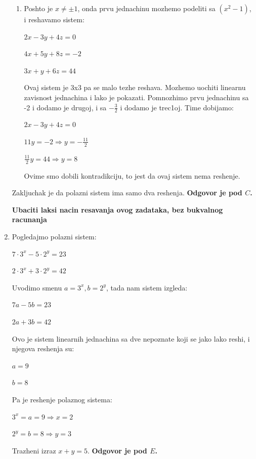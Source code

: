 \documentclass[a4paper,12pt]{article}
\begin{document}
\begin{enumerate}[1.]
\begin{enumerate}[1)]
\item Poshto je $x \neq \pm 1$, onda prvu jednachinu mozhemo podeliti sa $(x^2 - 1)$, i reshavamo sistem:
\begin{center}
\par $2x -3y + 4z = 0$
\par $4x + 5y +8z = -2$
\par $3x + y + 6z = 44$
\end{center}
\par Ovaj sistem je 3x3 pa se malo tezhe reshava. Mozhemo uochiti linearnu zavisnost jednachina i lako je pokazati. Pomnozhimo prvu jednachinu sa -2 i dodamo je drugoj, i sa $-\frac{3}{2}$ i dodamo je trec1oj. Time dobijamo:
\begin{center}
\par $2x -3y + 4z = 0$
\par $11y = -2 \Longrightarrow y = -\frac{11}{2}$
\par $\frac{11}{2}y = 44 \Longrightarrow y = 8$
\end{center}
\par Ovime smo dobili kontradikciju, to jest da ovaj sistem nema reshenje.
\end{enumerate}
\par Zakljuchak je da polazni sistem ima samo dva reshenja. \textbf{Odgovor je pod $C$.} 

\textbf{Ubaciti laksi nacin resavanja ovog zadataka, bez bukvalnog racunanja}

\item Pogledajmo polazni sistem:
\begin{center}
\par $7 \cdot 3^{x} - 5 \cdot 2^{y} = 23$
\par $2 \cdot 3^{x} + 3 \cdot 2^{y} = 42$
\end{center}
\par Uvodimo smenu $a = 3^x, b = 2^y$, tada nam sistem izgleda:
\begin{center}
\par $7 a - 5b = 23$
\par $2 a + 3 b = 42$
\end{center}
\par Ovo je sistem linearnih jednachina sa dve nepoznate koji se jako lako reshi, i njegova reshenja su:
\begin{center}
\par $a = 9$
\par $b = 8$
\end{center}
\par Pa je reshenje polaznog sistema:
\begin{center}
\par $3^x = a = 9\Longrightarrow x = 2$
\par $2^y = b = 8 \Longrightarrow y = 3$
\end{center}
\par Trazheni izraz $x+y = 5$. \textbf{Odgovor je pod $E$.}


\end{enumerate}
\end{document}
